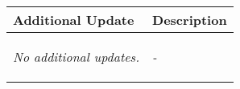 \begin{table}[!h]
    \centering
    \begin{tabularx}{\textwidth}{|l|X|}
        \hline
        Additional Update & Description \\
        \hline
        \hline
        \textit{No additional updates.} & 
        \begin{myitemize}
            \item \textit{-}
        \end{myitemize} \\
        \hline
    \end{tabularx}
\end{table}
